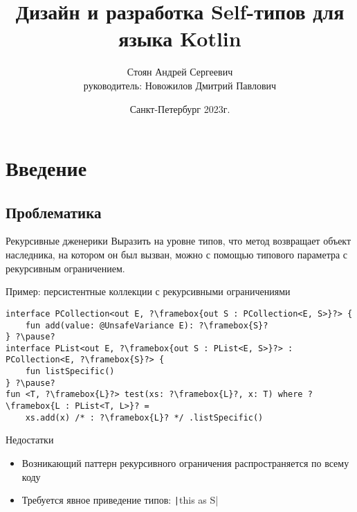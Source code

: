 \documentclass[handout,aspectratio=169,usenames,dvipsnames]{beamer}
\author[Андрей Стоян]{Стоян Андрей Сергеевич\\ {\footnotesize руководитель:} Новожилов Дмитрий Павлович}
\institute[ИТМО/SE]{Университет ИТМО\\Разработка программного обеспечения/Software engineering}
\title[Дизайн и разработка Self-типов для языка Kotlin]{Дизайн и разработка Self-типов для языка Kotlin}
\date{Санкт-Петербург 2023г.}
\begin{document}
    \maketitle



    \section{Введение}

    \subsection{Проблематика}

    \begin{frame}[fragile]{Рекурсивные дженерики}
        Выразить на уровне типов, что метод возвращает объект наследника, на котором он был вызван, можно с помощью типового параметра с рекурсивным ограничением.
        \pause
        \begin{block}{Пример: персистентные коллекции с рекурсивными ограничениями}
            \begin{verbatim}
interface PCollection<out E, ?\framebox{out S : PCollection<E, S>}?> {
    fun add(value: @UnsafeVariance E): ?\framebox{S}?
} ?\pause?
interface PList<out E, ?\framebox{out S : PList<E, S>}?> : PCollection<E, ?\framebox{S}?> {
    fun listSpecific()
} ?\pause?
fun <T, ?\framebox{L}?> test(xs: ?\framebox{L}?, x: T) where ?\framebox{L : PList<T, L>}? =
    xs.add(x) /* : ?\framebox{L}? */ .listSpecific()
            \end{verbatim}
        \end{block}
        \pause
        \begin{block}{Недостатки}
            \begin{itemize}
                \item Возникающий паттерн рекурсивного ограничения распространяется по всему коду
                \item Требуется явное приведение типов: \texttt|this as S|
            \end{itemize}
        \end{block}
    \end{frame}
\end{document}
